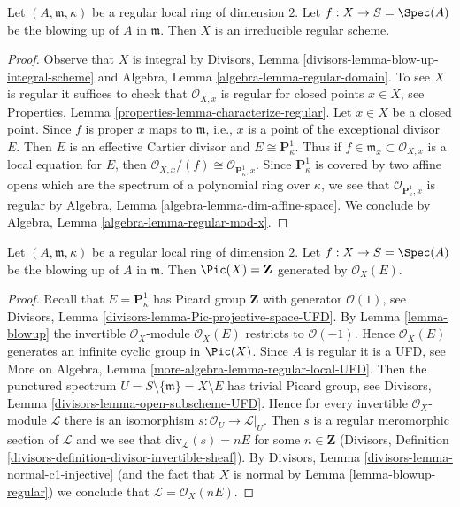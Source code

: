 \begin{lemma}
\label{lemma-blowup-regular}
Let $(A, \mathfrak m, \kappa)$ be a regular local ring of dimension $2$.
Let $f : X \to S = \Spec(A)$ be the blowing up of $A$ in $\mathfrak m$.
Then $X$ is an irreducible regular scheme.
\end{lemma}

\begin{proof}
Observe that $X$ is integral by
Divisors, Lemma \ref{divisors-lemma-blow-up-integral-scheme}
and
Algebra, Lemma \ref{algebra-lemma-regular-domain}.
To see $X$ is regular it suffices to check that $\mathcal{O}_{X, x}$
is regular for closed points $x \in X$, see
Properties, Lemma \ref{properties-lemma-characterize-regular}.
Let $x \in X$ be a closed point. Since $f$ is proper $x$ maps to
$\mathfrak m$, i.e., $x$ is a point of the exceptional divisor $E$.
Then $E$ is an effective Cartier divisor and $E \cong \mathbf{P}^1_\kappa$.
Thus if $f \in \mathfrak m_x \subset \mathcal{O}_{X, x}$ is a local
equation for $E$, then
$\mathcal{O}_{X, x}/(f) \cong \mathcal{O}_{\mathbf{P}^1_\kappa, x}$.
Since $\mathbf{P}^1_\kappa$ is covered by two affine opens which are the
spectrum of a polynomial ring over $\kappa$, we see that
$\mathcal{O}_{\mathbf{P}^1_\kappa, x}$ is regular by
Algebra, Lemma \ref{algebra-lemma-dim-affine-space}.
We conclude by
Algebra, Lemma \ref{algebra-lemma-regular-mod-x}.
\end{proof}

\begin{lemma}
\label{lemma-blowup-pic}
Let $(A, \mathfrak m, \kappa)$ be a regular local ring of dimension $2$.
Let $f : X \to S = \Spec(A)$ be the blowing up of $A$ in $\mathfrak m$.
Then $\Pic(X) = \mathbf{Z}$ generated by $\mathcal{O}_X(E)$.
\end{lemma}

\begin{proof}
Recall that $E = \mathbf{P}^1_\kappa$ has Picard group $\mathbf{Z}$
with generator $\mathcal{O}(1)$, see
Divisors, Lemma \ref{divisors-lemma-Pic-projective-space-UFD}.
By Lemma \ref{lemma-blowup} the invertible $\mathcal{O}_X$-module
$\mathcal{O}_X(E)$ restricts to $\mathcal{O}(-1)$. Hence
$\mathcal{O}_X(E)$ generates an infinite cyclic group in $\Pic(X)$.
Since $A$ is regular it is a UFD, see More on Algebra, 
Lemma \ref{more-algebra-lemma-regular-local-UFD}.
Then the punctured spectrum $U = S \setminus \{\mathfrak m\} = X \setminus E$
has trivial Picard group, see
Divisors, Lemma \ref{divisors-lemma-open-subscheme-UFD}.
Hence for every invertible $\mathcal{O}_X$-module $\mathcal{L}$
there is an isomorphism $s : \mathcal{O}_U \to \mathcal{L}|_U$.
Then $s$ is a regular meromorphic section of $\mathcal{L}$
and we see that $\text{div}_\mathcal{L}(s) = nE$ for some
$n \in \mathbf{Z}$
(Divisors, Definition \ref{divisors-definition-divisor-invertible-sheaf}).
By Divisors, Lemma \ref{divisors-lemma-normal-c1-injective}
(and the fact that $X$ is normal by Lemma \ref{lemma-blowup-regular})
we conclude that $\mathcal{L} = \mathcal{O}_X(nE)$.
\end{proof}

